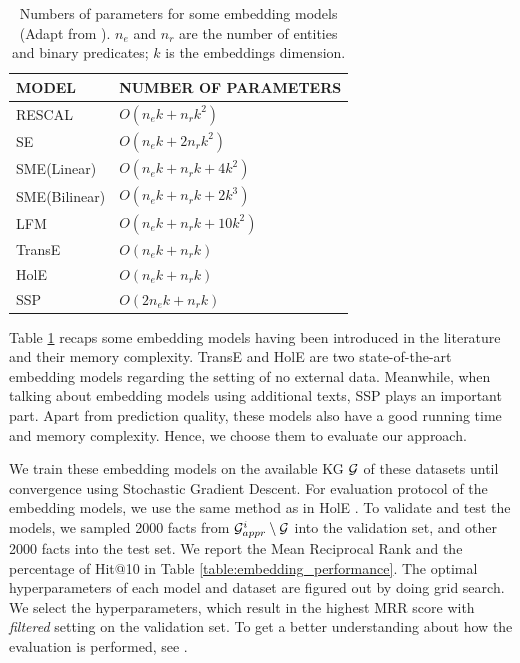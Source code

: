 \begin{table}[h]
\centering
\begin{tabular}{ | l | l | } 
 \hline
 MODEL & NUMBER OF PARAMETERS \\ 
 \hline
 RESCAL\cite{conf/icml/NickelTK11} & $O(n_ek +n_rk^2)$    \\ 
 SE\cite{Bordes:2011:LSE:2900423.2900470} & $O(n_ek +2n_rk^2)$ \\ 
 SME(Linear)\cite{DBLP:journals/corr/abs-1301-3485} & $O(n_ek +n_rk +4k^2)$  \\ 
 SME(Bilinear)\cite{DBLP:journals/corr/abs-1301-3485} &  $O(n_ek +n_rk +2k^3)$ \\ 
 LFM \cite{Jenatton:2012:LFM:2999325.2999488} &  $O(n_ek +n_rk +10k^2)$ \\
 \hline
 TransE \cite{Bordes:NIPS2013} & $O(n_ek +n_rk)$  \\ 
 HolE\cite{DBLP:conf/aaai/NickelRP16} & $O(n_ek +n_rk)$  \\ 
 \hline
 SSP \cite{DBLP:conf/aaai/0005HMZ17} & $O(2n_ek +n_rk)$\\
 \hline
\end{tabular}
\newline
\caption{Numbers of parameters for some embedding models (Adapt from \cite{Bordes:NIPS2013}). $n_e$ and $n_r$ are the number of entities and binary predicates; $k$ is the embeddings dimension.}
\label{table:embedding_recap}
\vspace*{-3mm}
\end{table}
Table \ref{table:embedding_recap} recaps some embedding models having been introduced in the literature and their memory complexity. TransE \cite{Bordes:NIPS2013} and HolE \cite{DBLP:conf/aaai/NickelRP16} are two state-of-the-art embedding models regarding the setting of no external data. Meanwhile, when talking about embedding models using additional texts, SSP \cite{DBLP:conf/aaai/0005HMZ17} plays an important part. Apart from prediction quality, these models also have a good running time and memory complexity. Hence, we choose them to evaluate our approach.


We train these embedding models on the available KG $\mathcal{G}$ of these datasets until convergence using Stochastic Gradient Descent. For evaluation protocol of the embedding models, we use the same method as in HolE \cite{DBLP:conf/aaai/NickelRP16}. To validate and test the models, we sampled 2000 facts from $\mathcal{G}^i_{appr} \setminus \mathcal{G}$ into the validation set, and other 2000 facts into the test set. We report the Mean Reciprocal Rank and the percentage of Hit@10 in Table \ref{table:embedding_performance}. The optimal hyperparameters  of each model and dataset are figured out by doing grid search. We select the hyperparameters, which result in the highest MRR score with \textit{filtered} setting on the validation set. To get a better understanding about how the evaluation is performed, see \cite{DBLP:conf/aaai/NickelRP16}.

